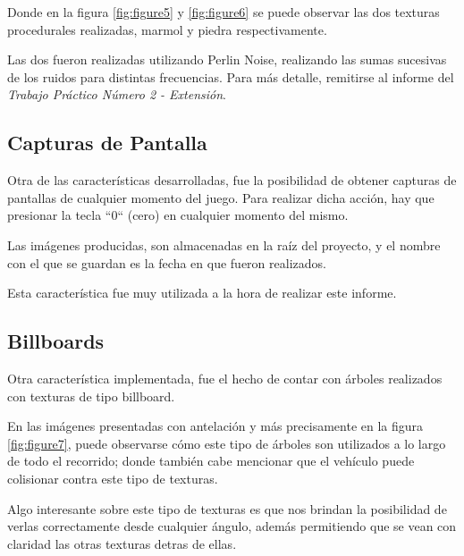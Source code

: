 \documentclass[a4paper,10pt]{article}
\begin{document}
Donde en la figura \ref{fig:figure5} y \ref{fig:figure6} se puede observar las
dos texturas procedurales realizadas, marmol y piedra respectivamente.

Las dos fueron realizadas utilizando Perlin Noise, realizando las sumas
sucesivas de los ruidos para distintas frecuencias.  Para más detalle,
remitirse al informe del \textit{Trabajo Práctico Número 2 - Extensión}.

\subsection{Capturas de Pantalla}

Otra de las características desarrolladas, fue la posibilidad de obtener
capturas de pantallas de cualquier momento del juego.  Para realizar dicha
acción, hay que presionar la tecla ``0`` (cero) en cualquier momento del
mismo.

Las imágenes producidas, son almacenadas en la raíz del proyecto, y el nombre
con el que se guardan es la fecha en que fueron realizados.

Esta característica fue muy utilizada a la hora de realizar este informe.

\subsection{Billboards}

Otra característica implementada, fue el hecho de contar con árboles realizados
con texturas de tipo billboard.

En las imágenes presentadas con antelación y más precisamente en la figura
\ref{fig:figure7}, puede observarse cómo este tipo de árboles son utilizados a
lo largo de todo el recorrido; donde también cabe mencionar que el vehículo
puede colisionar contra este tipo de texturas.

Algo interesante sobre este tipo de texturas es que nos brindan la posibilidad
de verlas correctamente desde cualquier ángulo, además permitiendo que se vean
con claridad las otras texturas detras de ellas.
\end{document}
